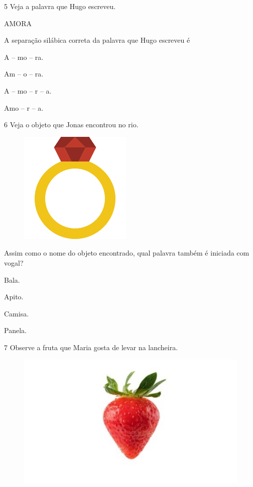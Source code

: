 \pagebreak
\num{5} Veja a palavra que Hugo escreveu.

\begin{myquote}
AMORA
\end{myquote}

A separação silábica correta da palavra que Hugo escreveu é

\begin{escolha}
\item A -- mo -- ra.

\item Am -- o -- ra.

\item A -- mo -- r -- a.

\item Amo -- r -- a.
\end{escolha}

\num{6} Veja o objeto que Jonas encontrou no rio.

\begin{figure}[htpb!]
\centering
\includegraphics[width=.4\textwidth]{media/image151.png}
\end{figure}


Assim como o nome do objeto encontrado, qual palavra também é iniciada com vogal?

\begin{escolha}
\item Bala.

\item Apito.

\item Camisa.

\item Panela.
\end{escolha}

\pagebreak
\num{7} Observe a fruta que Maria gosta de levar na lancheira.

\begin{figure}[htpb!]
\centering
\includegraphics[width=.5\textwidth]{media/image152.jpeg}
\end{figure}

